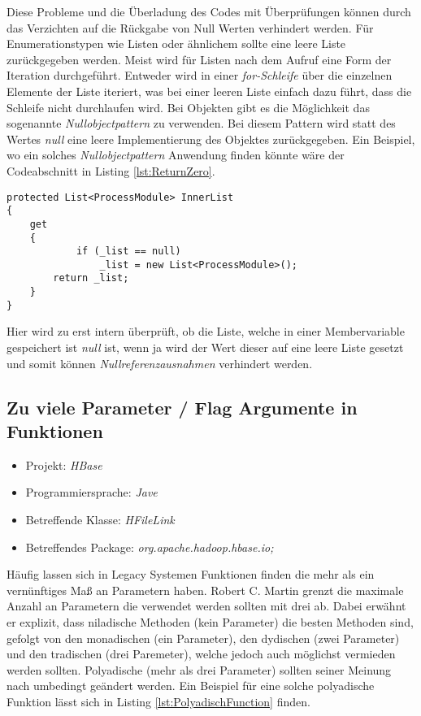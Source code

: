 \SuperPar Diese Probleme und die Überladung des Codes mit Überprüfungen können durch das Verzichten auf die Rückgabe von Null Werten verhindert werden. Für Enumerationstypen wie Listen oder ähnlichem sollte eine leere Liste zurückgegeben werden. Meist wird für Listen nach dem Aufruf eine Form der Iteration durchgeführt. Entweder wird in einer \textit{for-Schleife} über die einzelnen Elemente der Liste iteriert, was bei einer leeren Liste einfach dazu führt, dass die Schleife nicht durchlaufen wird. Bei Objekten gibt es die Möglichkeit das sogenannte \textit{Nullobjectpattern} zu verwenden. Bei diesem Pattern wird statt des Wertes \textit{null} eine leere Implementierung des Objektes zurückgegeben. Ein Beispiel, wo ein solches \textit{Nullobjectpattern} Anwendung finden könnte wäre der Codeabschnitt in Listing \ref{lst:ReturnZero}. 

\begin{lstlisting}[language={[Sharp]C}, caption=Beispiele für Rückgabe eines Null Wertes, label=lst:ReturnZero]
protected List<ProcessModule> InnerList
{
	get
	{
			if (_list == null)
				_list = new List<ProcessModule>();
		return _list;
	}
}
\end{lstlisting}

\SuperPar Hier wird zu erst intern überprüft, ob die Liste, welche in einer Membervariable gespeichert ist \textit{null} ist, wenn ja wird der Wert dieser auf eine leere Liste gesetzt und somit können \textit{Nullreferenzausnahmen} verhindert werden. 


\subsection{Zu viele Parameter / Flag Argumente in Funktionen}
\begin{itemize}
	\item Projekt: \textit{HBase}
	\item Programmiersprache: \textit{Jave}
	\item Betreffende Klasse: \textit{HFileLink}
	\item Betreffendes Package: \textit{org.apache.hadoop.hbase.io;}
\end{itemize}

\SuperPar Häufig lassen sich in Legacy Systemen Funktionen finden die mehr als ein vernünftiges Maß an Parametern haben. Robert C. Martin grenzt die maximale Anzahl an Parametern die verwendet werden sollten mit drei ab. Dabei erwähnt er explizit, dass niladische Methoden (kein Parameter) die besten Methoden sind, gefolgt von den monadischen (ein Parameter), den dydischen (zwei Parameter) und den tradischen (drei Paremeter), welche jedoch auch möglichst vermieden werden sollten. Polyadische (mehr als drei Parameter) sollten seiner Meinung nach umbedingt geändert werden. Ein Beispiel für eine solche polyadische Funktion lässt sich in Listing
 \ref{lst:PolyadischFunction} finden.

